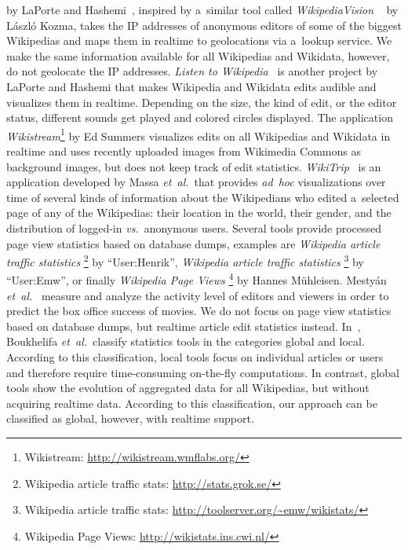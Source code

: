 \documentclass{sig-alternate}
\newcommand{\inlinelistingsize}{\fontsize{8pt}{11pt}}
\let\oldurl\url
\renewcommand{\url}[1]{\inlinelistingsize\oldurl{#1}}
\begin{document}
by LaPorte and Hashemi~\cite{laporte2013map},
inspired by a~similar tool called \emph{WikipediaVision}%
~\cite{kozma2013map} by László Kozma,
takes the IP addresses of anonymous editors
of some of the biggest Wikipedias and maps them
in realtime to geolocations via a~lookup service.
We make the same information available
for all Wikipedias and Wikidata, however,
do not geolocate the IP addresses.
\emph{Listen to Wikipedia}~\cite{laporte2013listen}
is another project by
LaPorte and Hashemi that makes Wikipedia and Wikidata edits
audible and visualizes them in realtime.
Depending on the size, the kind of edit, or the editor status,
different sounds get played and colored circles displayed.
The application \emph{Wikistream}\footnote{Wikistream:
\url{http://wikistream.wmflabs.org/}} by Ed Summers
visualizes edits on all Wikipedias and Wikidata
in realtime and uses recently uploaded images from Wikimedia Commons
as background images, but does not keep track of edit statistics.
\emph{WikiTrip}~\cite{massa2012wikitrip} is an application
developed by Massa \emph{et~al.}\ that provides \emph{ad~hoc}
visualizations over time of several kinds
of information about the Wikipedians
who edited a~selected page of any of the Wikipedias:
their location in the world,
their gender, and the distribution of logged-in \emph{vs.}\
anonymous users.
Several tools provide processed page view statistics
based on database dumps, examples are
\emph{Wikipedia article traffic statistics}%
\footnote{Wikipedia article traffic stats:
\url{http://stats.grok.se/}} by ``User:Henrik'',
\emph{Wikipedia article traffic statistics}%
\footnote{Wikipedia article traffic stats:
\url{http://toolserver.org/~emw/wikistats/}} by ``User:Emw'',
or finally \emph{Wikipedia Page Views}%
\footnote{Wikipedia Page Views: \url{http://wikistats.ins.cwi.nl/}}
by Hannes Mühleisen.
Mestyán \emph{et~al.}~\cite{mestyan2013boxoffice} measure and analyze the activity level of editors and viewers in order
to predict the box office success of movies.
We do not focus on page view statistics based on database dumps,
but realtime article edit statistics instead.
In~\cite{boukhelifa2010realtime}, Boukhelifa \emph{et~al.}\
classify statistics tools in the categories global and local.
According to this classification,
local tools focus on individual articles or users
and therefore require time-consuming on-the-fly computations.
In contrast,  global tools
show the evolution of aggregated data
for all Wikipedias,
but without acquiring realtime data.
According to this classification, our approach can be
classified as global, however, with realtime support.
\end{document}
